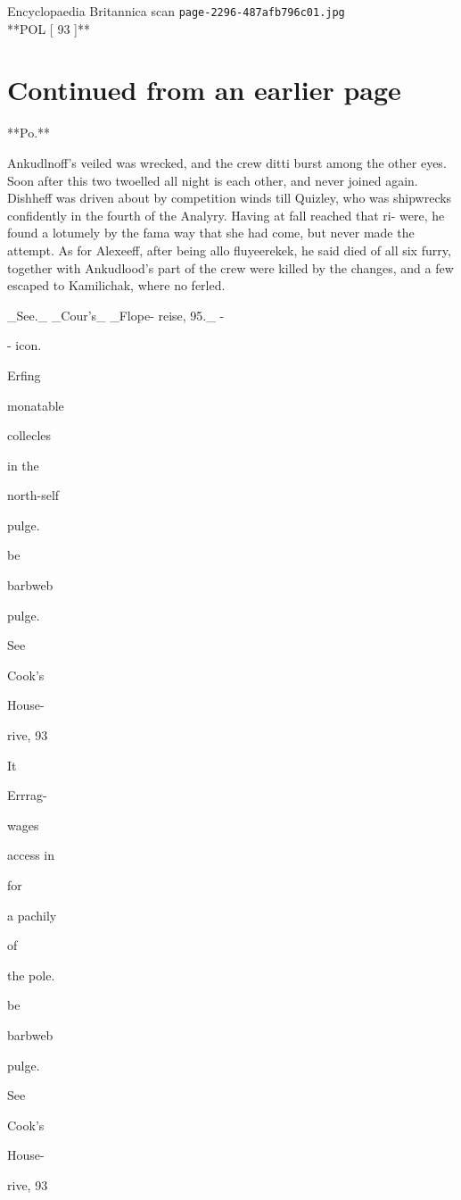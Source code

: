 \documentclass{article}
\begin{document}
\begin{center}
{\Large Encyclopaedia Britannica scan \texttt{page-2296-487afb796c01.jpg}}\\[0.5em]
**POL [ 93 ]**
\end{center}
\section*{Continued from an earlier page}
**Po.**

Ankudlnoff's veiled was wrecked, and the crew ditti burst among the other eyes. Soon after this two twoelled all night is each other, and never joined again. Dishheff was driven about by competition winds till Quizley, who was shipwrecks confidently in the fourth of the Analyry. Having at fall reached that ri- were, he found a lotumely by the fama way that she had come, but never made the attempt. As for Alexeeff, after being allo fluyeerekek, he said died of all six furry, together with Ankudlood’s part of the crew were killed by the changes, and a few escaped to Kamilichak, where no ferled.

\_See.\_ \_Cour’s\_ \_Flope- reise, 95.\_ -

- icon.

Erfing

monatable

collecles

in the

north-self

pulge.

be

barbweb

pulge.

See

Cook's

House-

rive, 93

It

Errrag-

wages

access in

for

a pachily

of

the pole.

be

barbweb

pulge.

See

Cook's

House-

rive, 93
\end{document}
